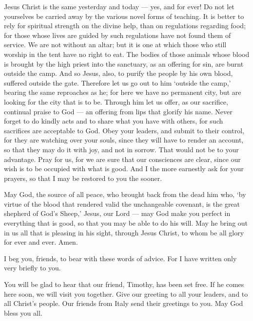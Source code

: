  Jesus Christ is the same yesterday and today --- yes, and
for ever!  Do not let yourselves be carried away by the
various novel forms of teaching. It is better to rely for spiritual
strength on the divine help, than on regulations regarding food; for
those whose lives are guided by such regulations have not found them of
service.  We are not without an altar; but it is one at
which those who still worship in the tent have no right to eat.
 The bodies of those animals whose blood is brought by the
high priest into the sanctuary, as an offering for sin, are burnt
outside the camp.  And so Jesus, also, to purify the people
by his own blood, suffered outside the gate.  Therefore let
us go out to him `outside the camp,' bearing the same reproaches as he;
 for here we have no permanent city, but are looking for
the city that is to be.  Through him let us offer, as our
sacrifice, continual praise to God --- an offering from lips that
glorify his name.  Never forget to do kindly acts and to
share what you have with others, for such sacrifices are acceptable to
God.  Obey your leaders, and submit to their control, for
they are watching over your souls, since they will have to render an
account, so that they may do it with joy, and not in sorrow. That would
not be to your advantage.  Pray for us, for we are sure
that our consciences are clear, since our wish is to be occupied with
what is good.  And I the more earnestly ask for your
prayers, so that I may be restored to you the sooner.

 May God, the source of all peace, who brought back from
the dead him who, `by virtue of the blood that rendered valid the
unchangeable covenant, is the great shepherd of God's Sheep,' Jesus, our
Lord ---  may God make you perfect in everything that is
good, so that you may be able to do his will. May he bring out in us all
that is pleasing in his sight, through Jesus Christ, to whom be all
glory for ever and ever. Amen.

 I beg you, friends, to bear with these words of advice.
For I have written only very briefly to you.

 You will be glad to hear that our friend, Timothy, has
been set free. If he comes here soon, we will visit you together.
 Give our greeting to all your leaders, and to all Christ's
people. Our friends from Italy send their greetings to you.
 May God bless you all.
